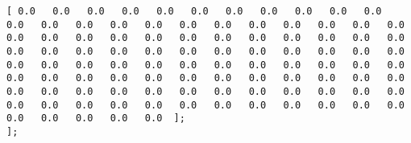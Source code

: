\documentclass[11pt]{article}
\begin{document}
\begin{Verbatim}[commandchars=\\\{\}]
[ 0.0   0.0   0.0   0.0   0.0   0.0   0.0   0.0   0.0   0.0   0.0   0.0   0.0   0.0   0.0   0.0   0.0   0.0   0.0   0.0   0.0   0.0   0.0   0.0   0.0   0.0   0.0   0.0   0.0   0.0   0.0   0.0   0.0   0.0   0.0   0.0   0.0   0.0   0.0   0.0   0.0   0.0   0.0   0.0   0.0   0.0   0.0   0.0   0.0   0.0   0.0   0.0   0.0   0.0   0.0   0.0   0.0   0.0   0.0   0.0   0.0   0.0   0.0   0.0   0.0   0.0   0.0   0.0   0.0   0.0   0.0   0.0   0.0   0.0   0.0   0.0   0.0   0.0   0.0   0.0   0.0   0.0   0.0   0.0   0.0   0.0   0.0   0.0   0.0   0.0   0.0   0.0   0.0   0.0   0.0   0.0   0.0   0.0   0.0   0.0  ];
];

    \end{Verbatim}


    
    
    
    
\end{document}

